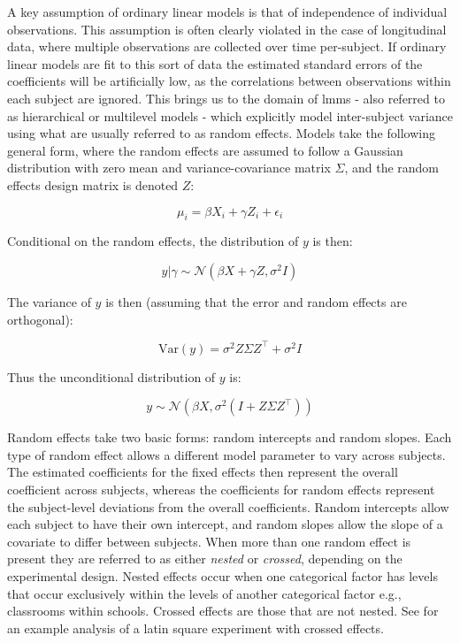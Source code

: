 \documentclass{report}
\begin{document}
A key assumption of ordinary linear models is that of independence of individual observations. This assumption is often clearly violated in the case of longitudinal data, where multiple observations are collected over time per-subject. If ordinary linear models are fit to this sort of data the estimated standard errors of the coefficients will be artificially low, as the correlations between observations within each subject are ignored. This brings us to the domain of \glspl{lmm} - also referred to as hierarchical or multilevel models - which explicitly model inter-subject variance using what are usually referred to as random effects. Models take the following general form, where the random effects are assumed to follow a Gaussian distribution with zero mean and variance-covariance matrix $\Sigma$, and the random effects design matrix is denoted $Z$:

\begin{equation}\label{eq:ols-mixed-model-form}
    \mu_i = \beta X_i + \gamma Z_i + \epsilon_i
\end{equation}

Conditional on the random effects, the distribution of $y$ is then:

\begin{equation}\label{eq:ols-mixed-model-y-dist-conditional}
    y|\gamma \sim \mathcal{N}\left(\beta X + \gamma Z, \sigma^2 I\right)
\end{equation}

The variance of $y$ is then (assuming that the error and random effects are orthogonal):

\begin{equation}\label{eq:ols-mixed-model-y-variance}
    \text{Var}(y) = \sigma^2 Z\Sigma Z^\intercal + \sigma^2 I
\end{equation}

Thus the unconditional distribution of $y$ is:

\begin{equation}\label{eq:ols-mixed-model-y-dist-unconditional}
    y \sim \mathcal{N}\left(\beta X, \sigma^2\left(I + Z \Sigma Z^\intercal\right)\right)
\end{equation}

Random effects take two basic forms: random intercepts and random slopes. Each type of random effect allows a different model parameter to vary across subjects. The estimated coefficients for the fixed effects then represent the overall coefficient across subjects, whereas the coefficients for random effects represent the subject-level deviations from the overall coefficients. Random intercepts allow each subject to have their own intercept, and random slopes allow the slope of a covariate to differ between subjects. When more than one random effect is present they are referred to as either \textit{nested} or \textit{crossed}, depending on the experimental design. Nested effects occur when one categorical factor has levels that occur exclusively within the levels of another categorical factor e.g., classrooms within schools. Crossed effects are those that are not nested. See \cite[Chapter~10.9]{faraway_extending_2016} for an example analysis of a latin square experiment with crossed effects. 
\end{document}
